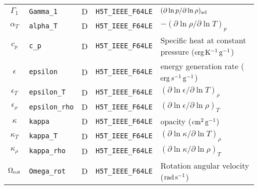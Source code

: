 \documentclass{article}
\newcommand{\cm}{\ensuremath{{\rm cm}}}
\newcommand{\gram}{\ensuremath{{\rm g}}}
\newcommand{\second}{\ensuremath{{\rm s}}}
\newcommand{\erg}{\ensuremath{{\rm erg}}}
\newcommand{\kelvin}{\ensuremath{{\rm K}}}
\begin{document}
\begin{table}[h!]
\begin{tabular}{|c|l|c|l|l|}
$\Gamma_{1}$      & \texttt{Gamma\_1}      & D & \texttt{H5T\_IEEE\_F64LE} & $(\partial \ln p/\partial \ln \rho)_{\rm ad}$ \\
$\alpha_{T}$      & \texttt{alpha\_T}      & D & \texttt{H5T\_IEEE\_F64LE} & $-(\partial \ln \rho/\partial \ln T)_{p}$  \\
$c_{p}$           & \texttt{c\_p}          & D &  \texttt{H5T\_IEEE\_F64LE} & Specific heat at constant pressure ($\erg\,\kelvin^{-1}\,\gram^{-1}$) \\
$\epsilon$        & \texttt{epsilon}      & D &  \texttt{H5T\_IEEE\_F64LE} & energy generation rate ($\erg\,s^{-1}\,\gram^{-1}$) \\
$\epsilon_{T}$    & \texttt{epsilon\_T}   & D &  \texttt{H5T\_IEEE\_F64LE} & $(\partial \ln \epsilon/\partial \ln T)_{\rho}$ \\
$\epsilon_{\rho}$ & \texttt{epsilon\_rho} & D &  \texttt{H5T\_IEEE\_F64LE} & $(\partial \ln \epsilon/\partial \ln \rho)_{T}$ \\
$\kappa$          & \texttt{kappa}       & D &  \texttt{H5T\_IEEE\_F64LE} & opacity ($\cm^{2}\,\gram^{-1}$) \\
$\kappa_{T}$      & \texttt{kappa\_T}     & D &  \texttt{H5T\_IEEE\_F64LE} & $(\partial \ln \kappa/\partial \ln T)_{\rho}$ \\
$\kappa_{\rho}$   & \texttt{kappa\_rho}   & D &  \texttt{H5T\_IEEE\_F64LE} & $(\partial \ln \kappa/\partial \ln \rho)_{T}$ \\
$\Omega_{\rm rot}$ & \texttt{Omega\_rot}   & D & \texttt{H5T\_IEEE\_F64LE} & Rotation angular velocity (${\rm rad}\,\second^{-1}$) \\  \hline
\end{tabular}
\end{table}
\end{document}
